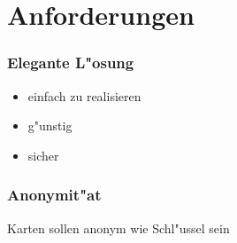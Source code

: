 \section{Anforderungen}
\begin{frame}
	\frametitle{Elegante L"osung}
	\begin{itemize}
		\item einfach zu realisieren
		\item g"unstig
		\item sicher
	\end{itemize}
\end{frame}

\begin{frame}
	\frametitle{Anonymit"at}
	Karten sollen anonym wie Schl"ussel sein
\end{frame}

